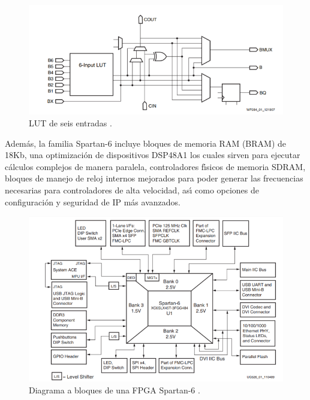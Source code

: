 \begin{doublespace}
\begin{figure}[H]
\begin{centering}
\includegraphics[scale=0.6]{img/6input}
\par\end{centering}
\caption{LUT de seis entradas \cite{clb_ov}.}

\end{figure}

\end{doublespace}

Adem\'{a}s, la familia Spartan-6 incluye bloques de memoria RAM (BRAM)
de 18Kb, una optimizaci\'{o}n de dispositivos DSP48A1 los cuales sirven
para ejecutar c\'{a}lculos complejos de manera paralela, controladores
f\'{\i}sicos de memoria SDRAM, bloques de manejo de reloj internos
mejorados para poder generar las frecuencias necesarias para controladores
de alta velocidad, as\'{\i} como opciones de configuraci\'{o}n y seguridad
de IP m\'{a}s avanzados.

\begin{doublespace}
\begin{figure}[H]
\begin{centering}
\includegraphics[scale=0.6]{img/blockd}
\par\end{centering}
\caption{Diagrama a bloques de una FPGA Spartan-6 \cite{clb_ov}.}

\end{figure}

\end{doublespace}

